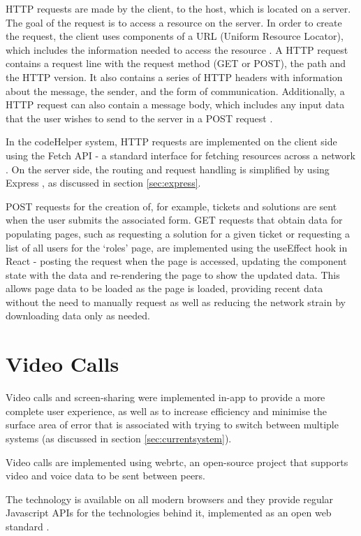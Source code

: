 HTTP requests are made by the client, to the host, which is located on a server. The goal of the request is to access a resource on the server. In order to create the request, the client uses components of a URL (Uniform Resource Locator), which includes the information needed to access the resource \cite{ibmhttp}. 
A HTTP request contains a request line with the request method (GET or POST), the path and the HTTP version. It also contains a series of HTTP headers with information about the message, the sender, and the form of communication. Additionally, a HTTP request can also contain a message body, which includes any input data that the user wishes to send to the server in a POST request \cite{ibmhttp}.

In the codeHelper system, HTTP requests are implemented on the client side using the Fetch API - a standard interface for fetching resources across a network \cite{fetch}. On the server side, the routing and request handling is simplified by using Express \cite{express}, as discussed in section \ref{sec:express}.

POST requests for the creation of, for example, tickets and solutions are sent when the user submits the associated form. GET requests that obtain data for populating pages, such as requesting a solution for a given ticket or requesting a list of all users for the `roles' page, are implemented using the useEffect hook in React \cite{useeffect} - posting the request when the page is accessed, updating the component state with the data and re-rendering the page to show the updated data. This allows page data to be loaded as the page is loaded, providing recent data without the need to manually request as well as reducing the network strain by downloading data only as needed.

\section{Video Calls}

Video calls and screen-sharing were implemented in-app to provide a more complete user experience, as well as to increase efficiency and minimise the surface area of error that is associated with trying to switch between multiple systems (as discussed in section \ref{sec:currentsystem}).

Video calls are implemented using \gls{webrtc}, an open-source project that supports video and voice data to be sent between peers.

The technology is available on all modern browsers and they provide regular Javascript APIs for the technologies behind it, implemented as an open web standard \cite{webrtc}. 

